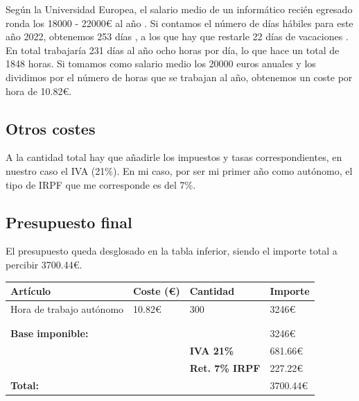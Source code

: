 Según la Universidad Europea, el salario medio de un informático recién egresado ronda los 18000 - 22000€ al año \cite{salario_ue}. Si contamos el número de días hábiles para este año 2022, obtenemos 253 días \cite{dias_laborables}, a los que hay que restarle 22 días de vacaciones \cite{vacaciones}. En total trabajaría 231 días al año ocho horas por día, lo que hace un total de 1848 horas. Si tomamos como salario medio los 20000 euros anuales y los dividimos por el número de horas que se trabajan al año, obtenemos un coste por hora de 10.82€.

\subsection{Otros costes}
A la cantidad total hay que añadirle los impuestos y tasas correspondientes, en nuestro caso el IVA (21\%). En mi caso, por ser mi primer año como autónomo, el tipo de IRPF que me corresponde es del 7\%.

\subsection{Presupuesto final}

El presupuesto queda desglosado en la tabla inferior, siendo el importe total a percibir 3700.44€.

\begin{table}[H]
\begin{tabular}{@{}llll@{}}
\toprule
\textbf{Artículo}        & \textbf{Coste (€)} & \textbf{Cantidad}      & \textbf{Importe} \\ \midrule
Hora de trabajo autónomo & 10.82€             & 300                    & 3246€            \\
                            &                    &                        &                  \\
                            &                    &                        &                  \\ \midrule
\textbf{Base imponible:} &                    & \textbf{}              & 3246€            \\
                            &                    & \textbf{IVA 21\%}      & 681.66€          \\
                            &                    & \textbf{Ret. 7\% IRPF} & 227.22€          \\ \midrule
\textbf{Total:}          &                    &                        & 3700.44€        
\end{tabular}
\end{table}